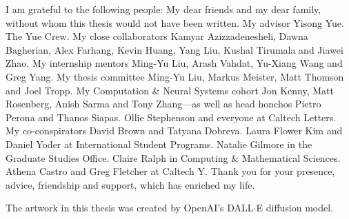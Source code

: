 \begin{acknowledgements}

I am grateful to the following people: 
My dear friends and my dear family, without whom this thesis would not have been written. My advisor Yisong Yue. The Yue Crew. My close collaborators Kamyar Azizzadenesheli, Dawna Bagherian, Alex Farhang, Kevin Huang, Yang Liu, Kushal Tirumala and Jiawei Zhao. My internship mentors Ming-Yu Liu, Arash Vahdat, Yu-Xiang Wang and Greg Yang. My thesis committee Ming-Yu Liu, Markus Meister, Matt Thomson and Joel Tropp. My Computation \& Neural Systems cohort Jon Kenny, Matt Rosenberg, Anish Sarma and Tony Zhang---as well as head honchos Pietro Perona and Thanos Siapas. Ollie Stephenson and everyone at Caltech Letters. My co-conspirators David Brown and Tatyana Dobreva. Laura Flower Kim and Daniel Yoder at International Student Programs. Natalie Gilmore in the Graduate Studies Office. Claire Ralph in Computing \& Mathematical Sciences. Athena Castro and Greg Fletcher at Caltech Y. Thank you for your presence, advice, friendship and support, which has enriched my life.

The artwork in this thesis was created by OpenAI's DALL$\cdot$E diffusion model.












\end{acknowledgements}